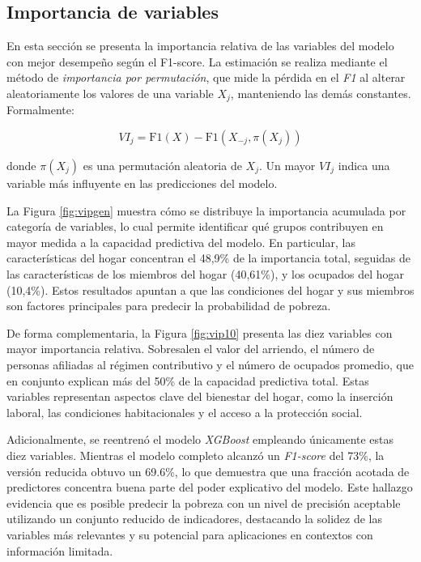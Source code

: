 

\subsection{Importancia de variables}

En esta sección se presenta la importancia relativa de las variables del modelo con mejor desempeño según el F1-score. La estimación se realiza mediante el método de \textit{importancia por permutación}, que mide la pérdida en el \textit{F1} al alterar aleatoriamente los valores de una variable \( X_j \), manteniendo las demás constantes. Formalmente:

\begin{equation}
VI_j = \text{F1}(X) - \text{F1}(X_{-j}, \pi(X_j))
\label{eq:vi}
\end{equation}

donde \( \pi(X_j) \) es una permutación aleatoria de \( X_j \). Un mayor \( VI_j \) indica una variable más influyente en las predicciones del modelo.


La Figura \ref{fig:vipgen} muestra cómo se distribuye la importancia acumulada por categoría de variables, lo cual permite identificar qué grupos contribuyen en mayor medida a la capacidad predictiva del modelo. En particular, las características del hogar concentran el 48,9\% de la importancia total, seguidas de las características de los miembros  del hogar (40,61\%), y los ocupados del hogar (10,4\%). Estos resultados apuntan a que las condiciones del hogar y sus miembros son factores principales para predecir la probabilidad de pobreza.



De forma complementaria, la Figura \ref{fig:vip10} presenta las diez variables con mayor importancia relativa. Sobresalen el valor del arriendo, el número de personas afiliadas al régimen contributivo y el  número de ocupados promedio, que en conjunto explican más del 50\% de la capacidad predictiva total. Estas variables representan aspectos clave del bienestar del hogar, como la inserción laboral, las condiciones habitacionales y el acceso a la protección social. 

Adicionalmente, se reentrenó el modelo \textit{XGBoost} empleando únicamente estas diez variables. Mientras el modelo completo alcanzó un \textit{F1-score} del 73\%, la versión reducida obtuvo un 69.6\%, lo que demuestra que una fracción acotada de predictores concentra buena parte del poder explicativo del modelo. Este hallazgo evidencia que es posible predecir la pobreza con un nivel de precisión aceptable utilizando un conjunto reducido de indicadores, destacando la solidez de las variables más relevantes y su potencial para aplicaciones en contextos con información limitada.
